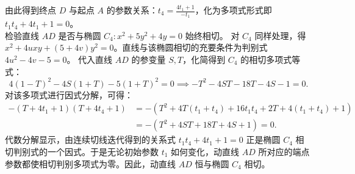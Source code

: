\begin{solution}
\[\]
由此得到终点 $D$ 与起点 $A$ 的参数关系：$t_4 = \frac{4t_1+1}{-t_1}$，化为多项式形式即 $t_1t_4 + 4t_1 + 1 = 0$。\\
检验直线 $AD$ 是否与椭圆 $C_4: x^2 + 5y^2 + 4y = 0$ 始终相切。
对 $C_4$ 同样处理，得 $x^2 + 4uxy + (5+4v)y^2 = 0$。直线与该椭圆相切的充要条件为判别式 $4u^2 - 4v - 5 = 0$。
代入直线 $AD$ 的参变量 $S, T$，化简得到 $C_4$ 的相切多项式等式：
\[
4(1-T)^2 - 4S(1+T) - 5(1+T)^2 = 0 \implies -T^2 - 4ST - 18T - 4S - 1 = 0.
\]
对该多项式进行因式分解，可得：
\begin{align*}
-(T + 4t_1 + 1)(T + 4t_4 + 1) &= -(T^2 + 4T(t_1+t_4) + 16t_1t_4 + 2T + 4(t_1+t_4) + 1) \\
&= -(T^2 + 4ST + 18T + 4S + 1) = 0.
\end{align*}
代数分解显示，由连续切线迭代得到的关系式 $t_1t_4 + 4t_1 + 1 = 0$ 正是椭圆 $C_4$ 相切判别式的一个因式。于是无论初始参数 $t_1$ 如何变化，动直线 $AD$ 所对应的端点参数都使相切判别多项式为零。因此，动直线 $AD$ 恒与椭圆 $C_4$ 相切。
\end{solution}


